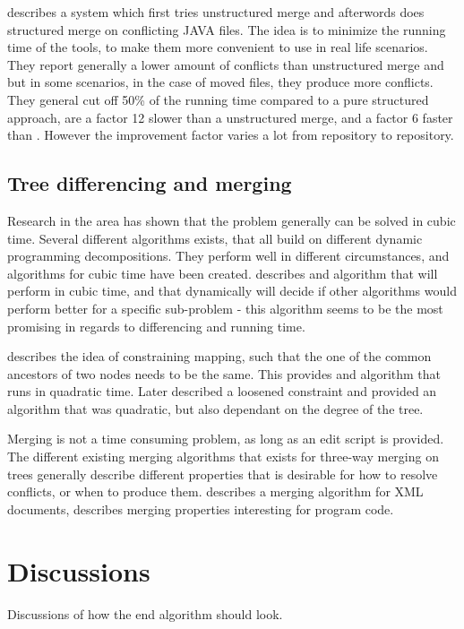 \documentclass[11pt]{article}
\begin{document}
\citet{Olav} describes a system which first tries unstructured merge and afterwords does structured merge on conflicting JAVA files. The idea is to minimize the running time of the tools, to make them more convenient to use in real life scenarios. They report generally a lower amount of conflicts than unstructured merge and \citet{Apel} but in some scenarios, in the case of moved files, they produce more conflicts. They general cut off 50\% of the running time compared to a pure structured approach, are a factor 12 slower than a unstructured merge, and a factor 6 faster than \citet{Apel}. However the improvement factor varies a lot from repository to repository.  

\subsection{Tree differencing and merging}
Research in the area has shown that the problem generally can be solved in cubic time. Several different algorithms exists, that all build on different dynamic programming decompositions. They perform well in different circumstances, and algorithms for cubic time have been created. \citet{Pawlik} describes and algorithm that will perform in cubic time, and that dynamically will decide if other algorithms would perform better for a specific sub-problem - this algorithm seems to be the most promising in regards to differencing and running time.

\citet{Zhang} describes the idea of constraining mapping, such that the one of the common ancestors of two nodes needs to be the same. This provides and algorithm that runs in quadratic time. Later \citet{Lu} described a loosened constraint and provided an algorithm that was quadratic, but also dependant on the degree of the tree.

Merging is not a time consuming problem, as long as an edit script is provided. The different existing merging algorithms that exists for three-way merging on trees generally describe different properties that is desirable for how to resolve conflicts, or when to produce them. \citet{lindholm} describes a merging algorithm for XML documents, \citet{Horwitz,Asklund,Olav} describes merging properties interesting for program code.

\clearpage

\section{Discussions}
Discussions of how the end algorithm should look.
\end{document}

